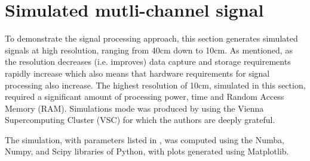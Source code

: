 \section{Simulated mutli-channel signal}
\label{sc:mysimulation}
To demonstrate the signal processing approach, this section generates simulated signals at high resolution, ranging from 40cm down to 10cm. As mentioned, as the resolution decreases (i.e. improves) data capture and storage requirements rapidly increase which also means that hardware requirements for signal processing also increase. The highest resolution of 10cm, simulated in this section, required a significant amount of processing power, time and Random Access Memory (RAM). Simulations mode was produced by using the Vienna Supercomputing Cluster (VSC) for which the authors are deeply grateful. 
\par
The simulation, with parameters listed in , was computed using the Numba, Numpy, and Scipy libraries of Python, with plots generated using Matplotlib.
